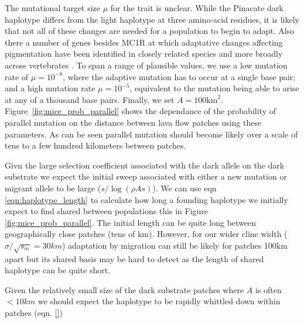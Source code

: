 \documentclass{article}
\begin{document}
The mutational target size $\mu$ for the trait is unclear. 
While the Pinacate dark haplotype differs from the light haplotype at three amino-acid residues,
it is likely that not all of these changes are needed for a population to begin to adapt. 
Also there a number of genes besides MC1R at which adaptative changes affecting pigmentation 
have been identified in closely related species and more broadly across vertebrates \citep{REF}.
To span a range of plausible values, we use a low mutation rate of $\mu= 10^{-8}$, 
where the adaptive mutation has to occur at a single base pair; 
and a high mutation rate $\mu= 10^{-5}$, equivalent to the mutation
being able to arise at any of a thousand base pairs.  
Finally, we set $A=100\text{km}^2$.
Figure~\ref{fig:mice_prob_parallel} shows the dependance of the probability
of parallel mutation on the distance between lava flow patches using these parameters. 
As can be seen parallel mutation should become
likely over a scale of tens to a few hundred kilometers between patches. 

Givn the large selection coefficient associated with the dark allele
on the dark substrate we expect the initial sweep associated with
either a new mutation or migrant allele to be large ($s/\log(\rho A
s)$). We can use eqn \eqref{eqn:haplotype_length} to calculate how long a
founding haplotype we initially expect to find shared between populations
this in Figure \ref{fig:mice_prob_parallel}. The initial length can be
quite long between geographically close patches (tens of km). However,
for our wider cline width ($\sigma/\sqrt{s_m} =30km$) adaptation by
migration can still be likely for patches 100km apart but its shared
basis may be hard to detect as the length of shared haplotype can be
quite short. 

Given the relatively small size of the dark substrate patches where
$A$ is often $<10km$ we should expect the haplotype to be rapidly
whittled down within patches (eqn. \ref{})
\end{document}
